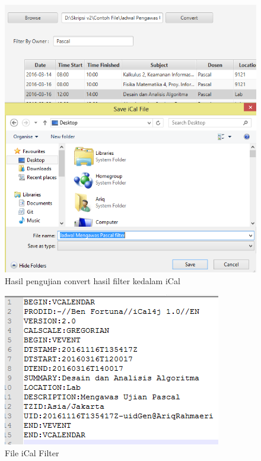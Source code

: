 \begin{enumerate}
\begin{figure}[H]
		\includegraphics[scale=0.6]{Gambar/filterKonvertiCal}
		\caption{Hasil pengujian convert hasil filter kedalam iCal}
		\label{fig:filterKonvertiCal}
		\end{figure}
		
		\begin{figure}[H]
		\centering
		\includegraphics[scale=0.7]{Gambar/fileiCalFilter}
		\caption{File iCal Filter}
		\label{fig:fileiCalFilter}
		\end{figure}
	

\end{enumerate}

